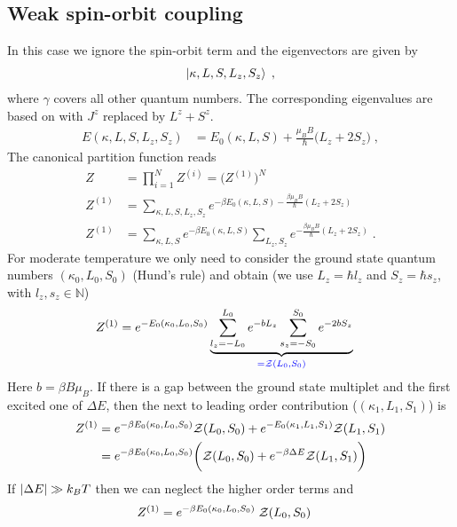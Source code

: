 \subsection{Weak spin-orbit coupling}
In this case we ignore the spin-orbit term and the eigenvectors are given by
%
\begin{align*}
\ket{\kappa,L,S,L_{z},S_{z}}\;,
\end{align*}
%
where $\gamma$ covers all other quantum numbers. The corresponding eigenvalues
are based on  with $J^{z}$ replaced by $L^{z}+S^{z}$.
%
\begin{align*}
E(\kappa,L,S,L_{z},S_{z}) &= E_{0}(\kappa,L,S) +\frac{\mu_{B} B}{\hbar}
\big( L_{z} + 2 S_{z}\big)\;,
\end{align*}
%
%
The canonical partition  function reads
%
\begin{align}\label{eq:}
Z &= \prod_{i=1}^{N} Z^{(i)} = \bigg(Z^{(1)}\bigg)^{N}\\
Z^{(1)} &= \sum_{\kappa,L,S,L_{z},S_{z}}
e^{-\beta E_{0}(\kappa,L,S) -\frac{\beta \mu_{B} B}{\hbar} (L_{z}+2S_{z})}\\
Z^{(1)} &= \sum_{\kappa,L,S}e^{-\beta E_{0}(\kappa,L,S)}
\sum_{L_{z},S_{z}}
e^{-\frac{\beta \mu_{B} B}{\hbar}(L_{z}+2S_{z})}\;.
\end{align}
%
 For moderate temperature we only need to consider the ground state quantum numbers $(\kappa_{0},L_{0},S_{0})$ (Hund's rule) and obtain
(we use $L_{z}=\hbar l_{z}$ and $S_{z}=\hbar s_{z}$, with $l_{z},s_{z}\in \mathbb N$)
%
\begin{align*}
Z^{(1)} &= e^{-E_{0}(\kappa_{0},L_{0},S_{0})} 
\underbrace{
\sum_{l_{z}=-L_{0}}^{L_{0}}e^{-b L_{z}}
\sum_{s_{z}=-S_{0}}^{S_{0}}e^{-2b S_{z}}
}_{\color{blue} = {\cal Z}(L_{0},S_{0})}
\end{align*}
%
Here $b=\beta B \mu_{B}$.
If there is a gap between the ground state multiplet and the first excited one of $\Delta E$,
then the next to leading order contribution ($(\kappa_{1},L_{1},S_{1})$) is
%
\begin{align*}
Z^{(1)}&= e^{-\beta E_{0}(\kappa_{0},L_{0},S_{0})}  {\cal Z}(L_{0},S_{0})
+e^{-E_{0}(\kappa_{1},L_{1},S_{1})}  {\cal Z}(L_{1},S_{1})\\
&= e^{-\beta E_{0}(\kappa_{0},L_{0},S_{0})} \bigg( {\cal Z}(L_{0},S_{0})
+e^{-\beta \Delta E}  {\cal Z}(L_{1},S_{1})\bigg)\\
\end{align*}
%
If $\abs{\Delta E}\gg k_{B}T$ then we can neglect the higher order terms and
\begin{align}
Z^{(1)} &= e^{-\beta E_{0}(\kappa_{0},L_{0},S_{0})} \;{\cal Z}(L_{0},S_{0})
\end{align}

